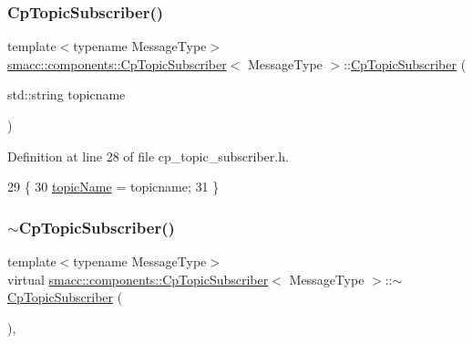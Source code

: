 \subsubsection{\texorpdfstring{Cp\+Topic\+Subscriber()}{CpTopicSubscriber()}\hspace{0.1cm}{\footnotesize\ttfamily [2/2]}}
{\footnotesize\ttfamily template$<$typename Message\+Type$>$ \\
\hyperlink{classsmacc_1_1components_1_1CpTopicSubscriber}{smacc\+::components\+::\+Cp\+Topic\+Subscriber}$<$ Message\+Type $>$\+::\hyperlink{classsmacc_1_1components_1_1CpTopicSubscriber}{Cp\+Topic\+Subscriber} (\begin{DoxyParamCaption}\item[{std\+::string}]{topicname }\end{DoxyParamCaption})\hspace{0.3cm}{\ttfamily [inline]}}



Definition at line 28 of file cp\+\_\+topic\+\_\+subscriber.\+h.


\begin{DoxyCode}
29     \{
30         \hyperlink{classsmacc_1_1components_1_1CpTopicSubscriber_a90e61b81d9bb33b886162eb41051fe1c}{topicName} = topicname;
31     \}
\end{DoxyCode}
\mbox{\label{classsmacc_1_1components_1_1CpTopicSubscriber_a82118e72ea660b4f651dd02f8caf51a5}} 
\subsubsection{\texorpdfstring{$\sim$\+Cp\+Topic\+Subscriber()}{~CpTopicSubscriber()}}
{\footnotesize\ttfamily template$<$typename Message\+Type$>$ \\
virtual \hyperlink{classsmacc_1_1components_1_1CpTopicSubscriber}{smacc\+::components\+::\+Cp\+Topic\+Subscriber}$<$ Message\+Type $>$\+::$\sim$\hyperlink{classsmacc_1_1components_1_1CpTopicSubscriber}{Cp\+Topic\+Subscriber} (\begin{DoxyParamCaption}{ }\end{DoxyParamCaption})\hspace{0.3cm}{\ttfamily [inline]}, {\ttfamily [virtual]}}



